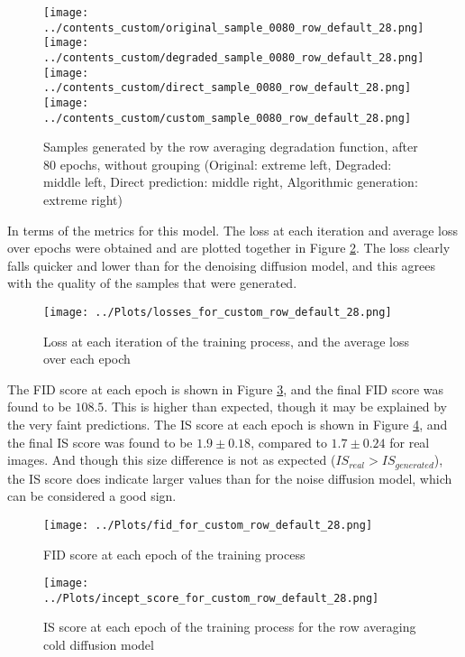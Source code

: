 \documentclass[12pt]{report} %
\begin{document}
\begin{figure}[ht]
  \centering
  \texttt{[image: ../contents\_custom/original\_sample\_0080\_row\_default\_28.png]}
  \texttt{[image: ../contents\_custom/degraded\_sample\_0080\_row\_default\_28.png]}
  \texttt{[image: ../contents\_custom/direct\_sample\_0080\_row\_default\_28.png]}
  \texttt{[image: ../contents\_custom/custom\_sample\_0080\_row\_default\_28.png]}
  \captionsetup{font=footnotesize}
  \caption{Samples generated by the row averaging degradation function, after 80 epochs, without grouping (Original: extreme left, Degraded: middle left, Direct prediction: middle right, Algorithmic generation: extreme right)}
  \label{fig:row_avg_samples2}
\end{figure}

In terms of the metrics for this model. The loss at each iteration and average loss over epochs were obtained and are plotted together in Figure \ref{fig:loss3}. The loss clearly falls quicker and lower than for the denoising diffusion model, and this agrees with the quality of the samples that were generated.

\begin{figure}[ht]
  \centering
  \texttt{[image: ../Plots/losses\_for\_custom\_row\_default\_28.png]}
  \captionsetup{font=footnotesize}
  \caption{Loss at each iteration of the training process, and the average loss over each epoch}
  \label{fig:loss3}
\end{figure}

The FID score at each epoch is shown in Figure \ref{fig:fid_col_avg}, and the final FID score was found to be $108.5$. This is higher than expected, though it may be explained by the very faint predictions. The IS score at each epoch is shown in Figure \ref{fig:is_col_avg}, and the final IS score was found to be $1.9 \pm 0.18$, compared to $1.7 \pm 0.24$ for real images. And though this size difference is not as expected ($IS_{real} > IS_{generated}$), the IS score does indicate larger values than for the noise diffusion model, which can be considered a good sign.

\begin{figure}[ht]
  \centering
  \texttt{[image: ../Plots/fid\_for\_custom\_row\_default\_28.png]}
  \captionsetup{font=footnotesize}
  \caption{FID score at each epoch of the training process}
  \label{fig:fid_col_avg}
\end{figure}

\begin{figure}[ht]
  \centering
  \texttt{[image: ../Plots/incept\_score\_for\_custom\_row\_default\_28.png]}
  \captionsetup{font=footnotesize}
  \caption{IS score at each epoch of the training process for the row averaging cold diffusion model}
  \label{fig:is_col_avg}
\end{figure}
\end{document}

